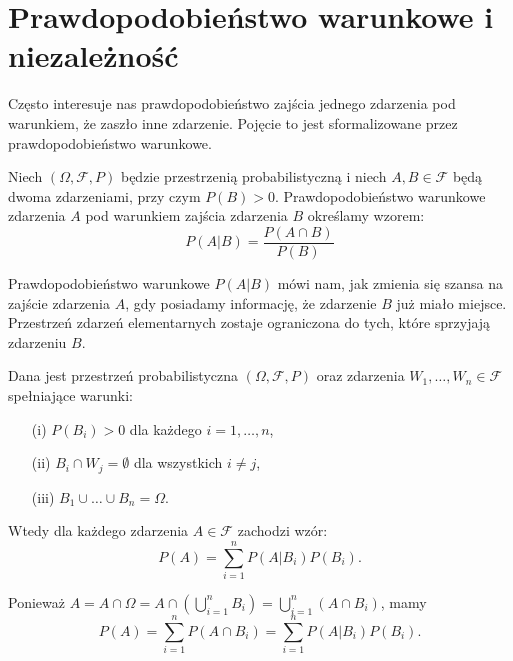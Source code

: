 \documentclass[final,a4paper,openany,12pt]{mwbk}
\begin{document}
\section{Prawdopodobieństwo warunkowe i niezależność}
Często interesuje nas prawdopodobieństwo zajścia jednego zdarzenia pod warunkiem, że zaszło inne zdarzenie. Pojęcie to jest sformalizowane przez prawdopodobieństwo warunkowe.

\begin{Def}
    Niech $(\Omega, \mathcal{F}, P)$ będzie przestrzenią probabilistyczną i niech $A, B \in \mathcal{F}$ będą dwoma zdarzeniami, przy czym $P(B) > 0$. Prawdopodobieństwo warunkowe zdarzenia $A$ pod warunkiem zajścia zdarzenia $B$ określamy wzorem:
    $$P(A|B) = \frac{P(A \cap B)}{P(B)}$$
\end{Def}


Prawdopodobieństwo warunkowe $P(A|B)$ mówi nam, jak zmienia się szansa na zajście zdarzenia $A$, gdy posiadamy informację, że zdarzenie $B$ już miało miejsce. Przestrzeń zdarzeń elementarnych zostaje ograniczona do tych, które sprzyjają zdarzeniu $B$.


\begin{Tw}
Dana jest przestrzeń probabilistyczna $(\Omega, \mathcal{F}, P)$ oraz zdarzenia $W_1, \dots, W_n \in \mathcal{F}$ spełniające warunki:
\begin{enumerate}
    \item[(i)] $P(B_i) > 0$ dla każdego $i = 1, \dots, n$,
    \item[(ii)] $B_i \cap W_j = \emptyset$ dla wszystkich $i \neq j$,
    \item[(iii)] $B_1 \cup \dots \cup B_n = \Omega$.
\end{enumerate}
Wtedy dla każdego zdarzenia $A \in \mathcal{F}$ zachodzi wzór:
\[
P(A) = \sum_{i=1}^{n} P(A|B_i)P(B_i).
\]
\end{Tw}
\begin{Dow}
    Ponieważ $A = A \cap \Omega = A \cap (\bigcup_{i=1}^{n} B_i) = \bigcup_{i=1}^{n} (A \cap B_i)$, mamy
\[
P(A) = \sum_{i=1}^{n} P(A \cap B_i) = \sum_{i=1}^{n} P(A|B_i)P(B_i).
\]
\end{Dow}
\end{document}
